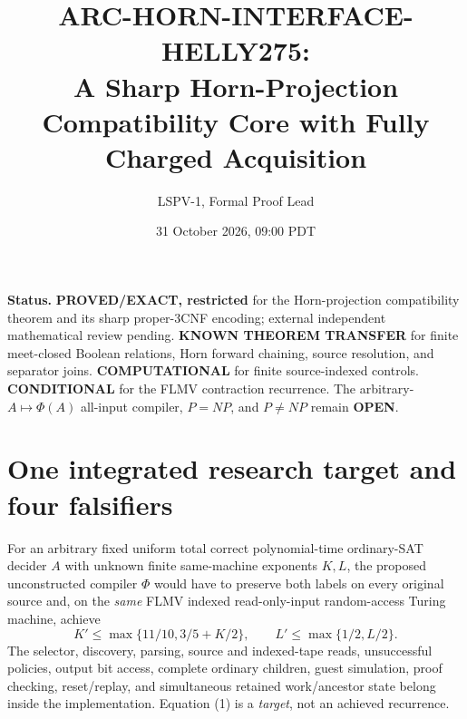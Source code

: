 \documentclass[11pt]{article}
\title{ARC-HORN-INTERFACE-HELLY275:\\
A Sharp Horn-Projection Compatibility Core with Fully Charged Acquisition}
\author{LSPV-1, Formal Proof Lead}
\date{31 October 2026, 09:00 PDT}
\begin{document}
\maketitle
\noindent\textbf{Status.} \textbf{PROVED/EXACT, restricted} for the
Horn-projection compatibility theorem and its sharp proper-3CNF encoding;
external independent mathematical review pending. \textbf{KNOWN THEOREM
TRANSFER} for finite meet-closed Boolean relations, Horn forward chaining,
source resolution, and separator joins. \textbf{COMPUTATIONAL} for finite
source-indexed controls. \textbf{CONDITIONAL} for the FLMV contraction
recurrence. The arbitrary-$A\mapsto\Phi(A)$ all-input compiler, $P=NP$, and
$P\ne NP$ remain \textbf{OPEN}.

\section{One integrated research target and four falsifiers}
For an arbitrary fixed uniform total correct polynomial-time ordinary-SAT
decider $A$ with unknown finite same-machine exponents $K,L$, the proposed
unconstructed compiler $\Phi$ would have to preserve both labels on every
original source and, on the \emph{same} FLMV indexed read-only-input
random-access Turing machine, achieve
\[
 K'\le\max\{11/10,3/5+K/2\},\qquad
 L'\le\max\{1/2,L/2\}.                                      \tag{1}
\]
The selector, discovery, parsing, source and indexed-tape reads, unsuccessful
policies, output bit access, complete ordinary children, guest simulation,
proof checking, reset/replay, and simultaneous retained work/ancestor state
belong inside the implementation.  Equation (1) is a \emph{target}, not an
achieved recurrence.
\end{document}
